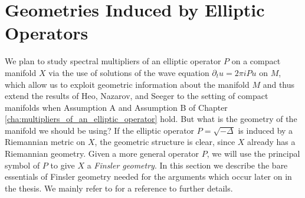 
\section{Geometries Induced by Elliptic Operators} \label{sec:geometriesinduced}

We plan to study spectral multipliers of an elliptic operator $P$ on a compact manifold $X$ via the use of solutions of the wave equation $\partial_t u = 2 \pi i P u$ on $M$, which allow us to exploit geometric information about the manifold $M$ and thus extend the results of Heo, Nazarov, and Seeger to the setting of compact manifolds when Assumption A and Assumption B of Chapter \ref{cha:multipliers_of_an_elliptic_operator} hold. But what is the geometry of the manifold we should be using? If the elliptic operator $P = \sqrt{-\Delta}$ is induced by a Riemannian metric on $X$, the geometric structure is clear, since $X$ already has a Riemannian geometry. Given a more general operator $P$, we will use the principal symbol of $P$ to give $X$ a \emph{Finsler geometry}. In this section we describe the bare essentials of Finsler geometry needed for the arguments which occur later on in the thesis. We mainly refer to \cite{BaoChern} for a reference to further details.

